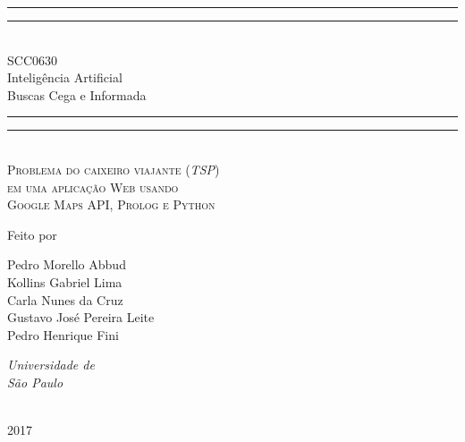 \documentclass[12pt,a4paper]{article}
\begin{document}
\newcommand*{\plogo}{\fbox{$\mathcal{ICMC}$}} %


\newcommand*{\titleGP}{\begingroup %
\centering %
\vspace*{\baselineskip} %

\rule{\textwidth}{1.6pt}\vspace*{-\baselineskip}\vspace*{2pt} %
\rule{\textwidth}{0.4pt}\\[\baselineskip] %

{\LARGE SCC0630\\ Inteligência Artificial\\[0.5\baselineskip] Buscas Cega e Informada}\\[0.2\baselineskip] %

\rule{\textwidth}{0.4pt}\vspace*{-\baselineskip}\vspace{3.2pt} %
\rule{\textwidth}{1.6pt}\\[\baselineskip] %

\scshape %
Problema do caixeiro viajante (\emph{TSP})\\ %
em uma aplicação Web usando \\ %
Google Maps API, Prolog e Python\par %

\vspace*{2\baselineskip} %

Feito por\\[\baselineskip]
{\Large Pedro Morello Abbud\\ 
Kollins Gabriel Lima 	\\	
Carla Nunes da Cruz 	\\
Gustavo José Pereira Leite \\	
Pedro Henrique Fini 		\par} %

\vfill %
{\itshape Universidade de\\ São Paulo\par} %

\vfill %

\plogo \\[0.3\baselineskip] %
{\scshape 2017} \\[0.3\baselineskip] %

\endgroup}
\titleGP
\newpage
\tableofcontents
\newpage
\end{document}
